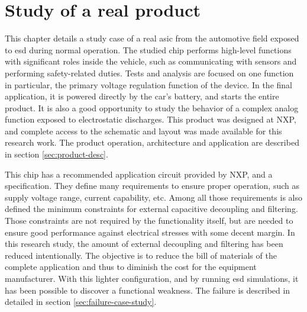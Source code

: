\section{Study of a real product}
\label{sec:study-real-product}

This chapter details a study case of a real \gls{asic} from the automotive field exposed to \gls{esd} during normal operation.
The studied chip performs high-level functions with significant roles inside the vehicle, such as communicating with sensors and performing safety-related duties.
Tests and analysis are focused on one function in particular, the primary voltage regulation function of the device.
In the final application, it is powered directly by the car's battery, and starts the entire product.
It is also a good opportunity to study the behavior of a complex analog function exposed to electrostatic discharges.
This product was designed at NXP, and complete access to the schematic and layout was made available for this research work.
The product operation, architecture and application are described in section \ref{sec:product-desc}.

This chip has a recommended application circuit provided by NXP, and a specification.
They define many requirements to ensure proper operation, such as supply voltage range, current capability, etc.
Among all those requirements is also defined the minimum constraints for external capacitive decoupling and filtering.
Those constraints are not required by the functionality itself, but are needed to ensure good performance against electrical stresses with some decent margin.
In this research study, the amount of external decoupling and filtering has been reduced intentionally.
The objective is to reduce the bill of materials of the complete application and thus to diminish the cost for the equipment manufacturer.
With this lighter configuration, and by running \gls{esd} simulations, it has been possible to discover a functional weakness.
The failure is described in detailed in section \ref{sec:failure-case-study}.



